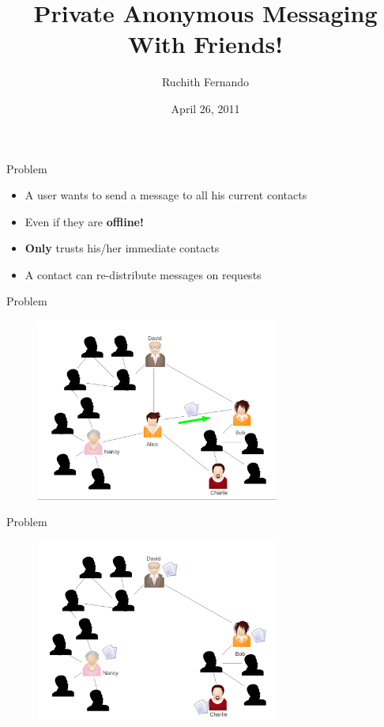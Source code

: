 \documentclass{beamer}
\title[CS 626 : Project Presentation]{Private Anonymous Messaging \\With Friends!}
\author{Ruchith Fernando}
\institute{Purdue University}
\date{April 26, 2011}
\begin{document}
\begin{frame}
\titlepage
\end{frame}


\begin{frame}{Problem}
\begin{itemize}
\item A user wants to send a message to all his current contacts
\item Even if they are \textbf{offline!}
\item \textbf{Only} trusts his/her immediate contacts
\item A contact can re-distribute messages on requests
\end{itemize}
\end{frame}


\begin{frame}{Problem}
\begin{figure}
\includegraphics[height=6cm]{img/img1.png} 
\end{figure}
\end{frame}


\begin{frame}{Problem}
\begin{figure}
\includegraphics[height=6cm]{img/img2.png} 
\end{figure}
\end{frame}
\end{document}
